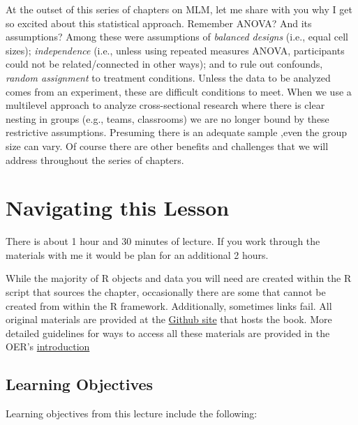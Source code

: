 \documentclass[
  english,
]{book}
\begin{document}
At the outset of this series of chapters on MLM, let me share with you why I get so excited about this statistical approach. Remember ANOVA? And its assumptions? Among these were assumptions of \emph{balanced designs} (i.e., equal cell sizes); \emph{independence} (i.e., unless using repeated measures ANOVA, participants could not be related/connected in other ways); and to rule out confounds, \emph{random assignment} to treatment conditions. Unless the data to be analyzed comes from an experiment, these are difficult conditions to meet. When we use a multilevel approach to analyze cross-sectional research where there is clear nesting in groups (e.g., teams, classrooms) we are no longer bound by these restrictive assumptions. Presuming there is an adequate sample \citep[ suggested a minimum of 10 clusters with 5 members each]{bell_how_2014},even the group size can vary. Of course there are other benefits and challenges that we will address throughout the series of chapters.

\hypertarget{navigating-this-lesson}{%
\section{Navigating this Lesson}\label{navigating-this-lesson}}

There is about 1 hour and 30 minutes of lecture. If you work through the materials with me it would be plan for an additional 2 hours.

While the majority of R objects and data you will need are created within the R script that sources the chapter, occasionally there are some that cannot be created from within the R framework. Additionally, sometimes links fail. All original materials are provided at the \href{https://github.com/lhbikos/ReC_CPA}{Github site} that hosts the book. More detailed guidelines for ways to access all these materials are provided in the OER's \protect\hyperlink{ReCintro}{introduction}

\hypertarget{learning-objectives}{%
\subsection{Learning Objectives}\label{learning-objectives}}

Learning objectives from this lecture include the following:
\end{document}
